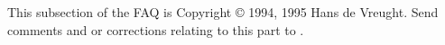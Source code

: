 This subsection of the FAQ is Copyright © 1994, 1995 Hans de Vreught.
Send comments and or corrections relating to this part to
\href{mailto:\emailhans}{\emailhans}.
